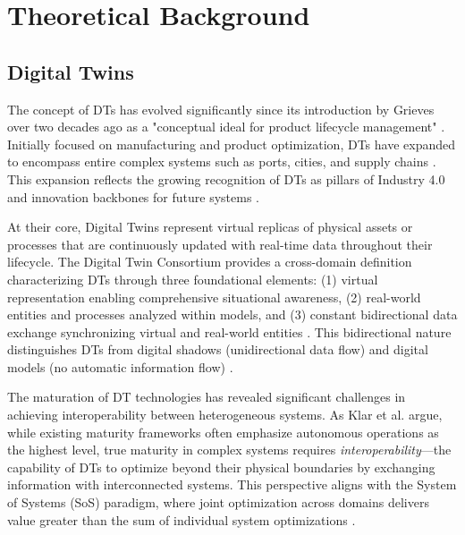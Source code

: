 \chapter{Theoretical Background}
\label{chap:background}

\section{Digital Twins}

The concept of DTs has evolved significantly since its introduction by Grieves over two decades ago as a "conceptual ideal for product lifecycle management" \cite{Grieves_2017}.
Initially focused on manufacturing and product optimization, DTs have expanded to encompass entire complex systems such as 
    ports, cities, and supply chains \cite{Klar_2024}.
This expansion reflects the growing recognition of DTs as pillars of Industry 4.0 and innovation backbones for future systems \cite{Jiang_2021}.

At their core, Digital Twins represent virtual replicas of physical assets or processes that are continuously updated with real-time data throughout their lifecycle.
The Digital Twin Consortium provides a cross-domain definition characterizing DTs through three foundational elements:
    (1) virtual representation enabling comprehensive situational awareness,
    (2) real-world entities and processes analyzed within models, and
    (3) constant bidirectional data exchange synchronizing virtual and real-world entities \cite{Budiardjo_2021}.
This bidirectional nature distinguishes DTs from 
    digital shadows (unidirectional data flow) and 
    digital models (no automatic information flow) \cite{Botín-Sanabria_2022}.

The maturation of DT technologies has revealed significant challenges in achieving interoperability between heterogeneous systems.
As Klar et al. \cite{Klar_2024} argue, while existing maturity frameworks often emphasize autonomous operations as the highest level,
    true maturity in complex systems requires 
    \emph{interoperability}—the capability of DTs to optimize beyond their physical boundaries by exchanging information with interconnected systems.
This perspective aligns with the System of Systems (SoS) paradigm, where 
    joint optimization across domains delivers value greater than the sum of individual system optimizations \cite{Dietz_2020}.

